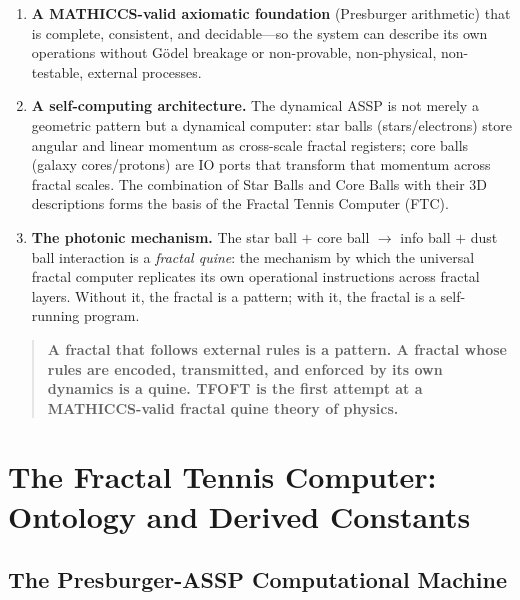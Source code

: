 \documentclass[11pt,a4paper]{article}
\begin{document}
\begin{enumerate}
  \item \textbf{A MATHICCS-valid axiomatic foundation} (Presburger arithmetic) that
        is complete, consistent, and decidable---so the system can describe its own
        operations without G\"odel breakage or non-provable, non-physical, non-testable,
        external processes.

  \item \textbf{A self-computing architecture.} The dynamical ASSP is not merely a
        geometric pattern but a dynamical computer: star balls (stars/electrons) store
        angular and linear momentum as cross-scale fractal registers; core balls
        (galaxy cores/protons) are IO ports that transform that momentum across fractal
        scales. The combination of Star Balls and Core Balls with their 3D descriptions
        forms the basis of the Fractal Tennis Computer (FTC).

  \item \textbf{The photonic mechanism.} The star ball $+$ core ball $\to$ info ball
        $+$ dust ball interaction is a \emph{fractal quine}: the mechanism by which
        the universal fractal computer replicates its own operational instructions
        across fractal layers. Without it, the fractal is a pattern; with it, the
        fractal is a self-running program.
\end{enumerate}

\begin{quote}
\textbf{A fractal that follows external rules is a pattern. A fractal whose rules
are encoded, transmitted, and enforced by its own dynamics is a quine. TFOFT is the
first attempt at a MATHICCS-valid fractal quine theory of physics.}
\end{quote}


\section{The Fractal Tennis Computer: Ontology and Derived Constants}
\label{sec:ftc}

\subsection{The Presburger-ASSP Computational Machine}
\end{document}
